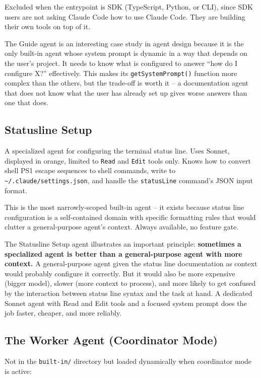 \documentclass[
  english,
  11pt,
  letterpaper,
]{book}
\begin{document}
Excluded when the entrypoint is SDK (TypeScript, Python, or CLI), since
SDK users are not asking Claude Code how to use Claude Code. They are
building their own tools on top of it.

The Guide agent is an interesting case study in agent design because it
is the only built-in agent whose system prompt is dynamic in a way that
depends on the user's project. It needs to know what is configured to
answer ``how do I configure X?'' effectively. This makes its
\texttt{getSystemPrompt()} function more complex than the others, but
the trade-off is worth it -- a documentation agent that does not know
what the user has already set up gives worse answers than one that does.

\subsection{Statusline Setup}\label{statusline-setup}

A specialized agent for configuring the terminal status line. Uses
Sonnet, displayed in orange, limited to \texttt{Read} and \texttt{Edit}
tools only. Knows how to convert shell PS1 escape sequences to shell
commands, write to \texttt{\textasciitilde{}/.claude/settings.json}, and
handle the \texttt{statusLine} command's JSON input format.

This is the most narrowly-scoped built-in agent -- it exists because
status line configuration is a self-contained domain with specific
formatting rules that would clutter a general-purpose agent's context.
Always available, no feature gate.

The Statusline Setup agent illustrates an important principle:
\textbf{sometimes a specialized agent is better than a general-purpose
agent with more context.} A general-purpose agent given the status line
documentation as context would probably configure it correctly. But it
would also be more expensive (bigger model), slower (more context to
process), and more likely to get confused by the interaction between
status line syntax and the task at hand. A dedicated Sonnet agent with
Read and Edit tools and a focused system prompt does the job faster,
cheaper, and more reliably.

\subsection{The Worker Agent (Coordinator
Mode)}\label{the-worker-agent-coordinator-mode}

Not in the \texttt{built-in/} directory but loaded dynamically when
coordinator mode is active:
\end{document}
